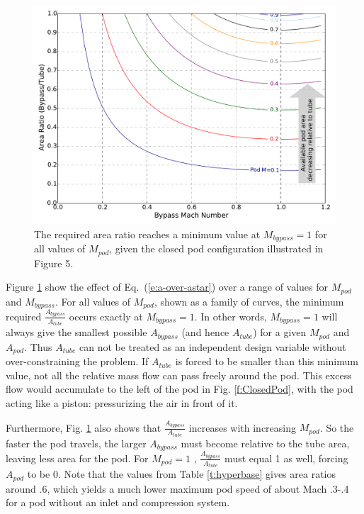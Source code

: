 \documentclass[heading.tex]{subfiles}
\begin{document}
\begin{figure}[!htb]
  \centering
  \includegraphics[width=.9\textwidth]{images/areaPlot.pdf}
  \caption{The required area ratio reaches a minimum value at $M_{bypass}=1$ for all values of $M_{pod}$, given the closed pod configuration illustrated in Figure 5.}
  \label{f:choked-flow}
\end{figure}

Figure \ref{f:choked-flow} show the effect of Eq.~(\ref{e:a-over-astar}) over a range of values for $M_{pod}$ and $M_{bypass}$. 
For all values of $M_{pod}$, shown as a family of curves, the minimum required $\frac{A_{bypass}}{A_{tube}}$ occurs exactly at $M_{bypass}=1$.
In other words, 
$M_{bypass}=1$ will always give the smallest possible $A_{bypass}$ (and hence $A_{tube}$) for a given 
$M_{pod}$ and $A_{pod}$. Thus $A_{tube}$ can not be treated as an independent design variable without over-constraining the problem.
If $A_{tube}$ is forced to be smaller than this minimum value, not all the relative mass flow can pass freely around the pod. This excess 
flow would accumulate to the left of the pod in Fig. \ref{f:ClosedPod},
with the pod acting like a piston: pressurizing the air in front of it. 

Furthermore, Fig. \ref{f:choked-flow} also shows that $\frac{A_{bypass}}{A_{tube}}$ 
increases with increasing $M_{pod}$. So the faster the pod travels, the larger $A_{bypass}$ 
must become relative to the tube area, leaving less area for the pod. For $M_{pod} = 1$ , $\frac{A_{bypass}}{A_{tube}}$ must 
equal 1 as well, forcing $A_{pod}$ to be 0. Note that the values from Table \ref{t:hyperbase} gives area ratios around .6, 
which yields a much lower maximum pod speed of about Mach .3-.4 for a pod without an inlet and compression system. 
\end{document}
